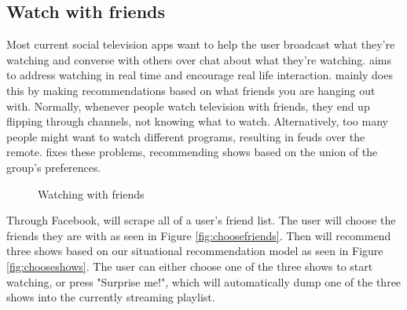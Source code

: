 \subsection{Watch with friends}
Most current social television apps want to help the user broadcast
what they're watching and converse with others over chat about what
they're watching.  {\sys} aims to address watching in real time and
encourage real life interaction.  {\sys} mainly does this by making
recommendations based on what friends you are hanging out with.
Normally, whenever people watch television with friends, they end up
flipping through channels, not knowing what to watch.  Alternatively,
too many people might want to watch different programs, resulting in
feuds over the remote.  {\sys} fixes these problems, recommending
shows based on the union of the group's preferences.

\begin{figure}
\centering
{}


\caption{Watching with friends}
\label{fig:friends}
\end{figure}

Through Facebook, {\sys} will scrape all of a user's friend list.  The
user will choose the friends they are with as seen in Figure \ref{fig:choosefriends}.  Then {\sys} will
recommend three shows based on our situational recommendation model as seen in Figure \ref{fig:chooseshows}. The user can either choose one of the three shows to start watching,
or press "Surprise me!", which will automatically dump one of the
three shows into the currently streaming playlist.

